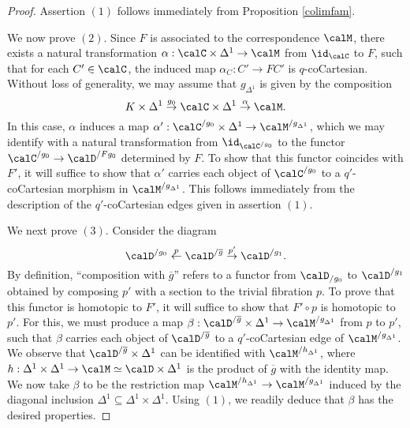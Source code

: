 \begin{proof}
Assertion $(1)$ follows immediately from Proposition \ref{colimfam}.

We now prove $(2)$. Since $F$ is associated to the correspondence $\calM$, 
there exists a natural transformation $\alpha: \calC \times \Delta^1 
\rightarrow \calM$ from $\id_{\calC}$ to $F$, such that for each $C' \in 
\calC$, the induced map $\alpha_{C}: C' \rightarrow FC'$ is 
$q$-coCartesian. Without loss of generality, we may assume that 
$g_{\Delta^1}$ is given by the composition
$$ K \times \Delta^1 \stackrel{ g_0}{\rightarrow} \calC \times \Delta^1
\stackrel{\alpha}{\rightarrow} \calM.$$
In this case, $\alpha$ induces a map $\alpha': \calC^{/g_0} 
\times \Delta^1 \rightarrow \calM^{/ g_{\Delta^1}}$, which we may identify 
with a natural transformation from $\id_{\calC^{/g_0}}$ to the functor 
$\calC^{/g_0} \rightarrow \calD^{/Fg_0}$ determined by $F$. To show that 
this functor coincides with $F'$, it will suffice to show that $\alpha'$ 
carries each object of $\calC^{/g_0}$ to a $q'$-coCartesian morphism in 
$\calM^{ /g_{\Delta^1}}$. This follows immediately from the description of 
the $q'$-coCartesian edges given in assertion $(1)$.

We next prove $(3)$. Consider the diagram
$$ \calD^{ / g_0} \stackrel{p}{\leftarrow} \calD^{/\overline{g}} 
\stackrel{p'}{\rightarrow} \calD^{/g_1}.$$
By definition, ``composition with $\overline{g}$'' refers to a functor 
from $\calD_{/g_0}$ 
to $\calD^{/g_1}$ obtained by composing $p'$ with a section to the trivial 
fibration $p$.
To prove that this functor is homotopic to $F'$, it will suffice to show that
$F' \circ p$ is homotopic to $p'$. For this, we must produce a map
$\beta: \calD^{/\overline{g}} \times \Delta^1 \rightarrow \calM^{ / 
g_{\Delta^1}}$ from
$p$ to $p'$, such that $\beta$ carries each object of 
$\calD^{/\overline{g}}$ to a 
$q'$-coCartesian edge of $\calM^{/g_{\Delta^1}}$. We observe that
$\calD^{/\overline{g}} \times \Delta^1$ can be identified with 
$\calM^{/h_{\Delta^1}}$, where
$h: \Delta^1 \times \Delta^1 \rightarrow \calM \simeq \calD \times \Delta^1$ is the product
of $\overline{g}$ with the identity map. We now take $\beta$ to be the 
restriction map
$\calM^{ / h_{\Delta^1} } \rightarrow \calM^{ / g_{\Delta^1} }$ induced by the diagonal
inclusion $\Delta^1 \subseteq \Delta^1 \times \Delta^1$. Using $(1)$, we readily deduce that
$\beta$ has the desired properties.


\end{proof}
